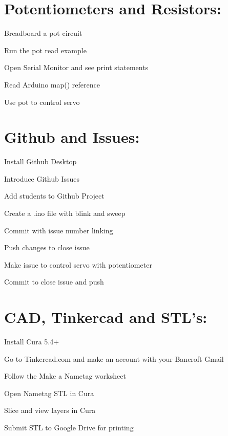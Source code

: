 \documentclass{article}
\begin{document}
\section{Potentiometers and Resistors:}
\begin{todolist}
	\item Breadboard a pot circuit
	\item Run the pot read example
	\item Open Serial Monitor and see print statements
	\item Read Arduino map() reference
	\item Use pot to control servo
\end{todolist}


	
\section{Github and Issues:}
\begin{todolist}	
	\item Install Github Desktop
	\item Introduce Github Issues
	\item Add students to Github Project
	\item Create a .ino file with blink and sweep
	\item Commit with issue number linking
	\item Push changes to close issue
	\item Make issue to control servo with potentiometer
	\item Commit to close issue and push
\end{todolist}

\newpage	
\section{CAD, Tinkercad and STL's:}
\begin{todolist}
	\item Install Cura 5.4+	
	\item Go to Tinkercad.com and make an account with your Bancroft Gmail
	\item Follow the Make a Nametag worksheet
	\item Open Nametag STL in Cura
	\item Slice and view layers in Cura
	\item Submit STL to Google Drive for printing
\end{todolist}
\end{document}
